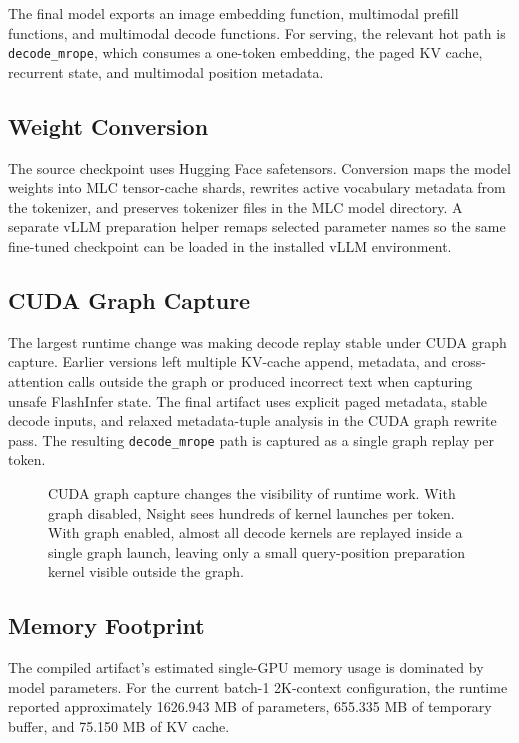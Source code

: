 \documentclass[10pt]{article}
\begin{document}
The final model exports an image embedding function, multimodal prefill
functions, and multimodal decode functions. For serving, the relevant hot path
is \texttt{decode\_mrope}, which consumes a one-token embedding, the paged KV
cache, recurrent state, and multimodal position metadata.

\subsection{Weight Conversion}

The source checkpoint uses Hugging Face safetensors. Conversion maps the model
weights into MLC tensor-cache shards, rewrites active vocabulary metadata from
the tokenizer, and preserves tokenizer files in the MLC model directory. A
separate vLLM preparation helper remaps selected parameter names so the same
fine-tuned checkpoint can be loaded in the installed vLLM environment.

\subsection{CUDA Graph Capture}

The largest runtime change was making decode replay stable under CUDA graph
capture. Earlier versions left multiple KV-cache append, metadata, and
cross-attention calls outside the graph or produced incorrect text when
capturing unsafe FlashInfer state. The final artifact uses explicit paged
metadata, stable decode inputs, and relaxed metadata-tuple analysis in the CUDA
graph rewrite pass. The resulting \texttt{decode\_mrope} path is captured as a
single graph replay per token.

\begin{figure}[t]
  \centering
  
  \caption{CUDA graph capture changes the visibility of runtime work. With graph
  disabled, Nsight sees hundreds of kernel launches per token. With graph
  enabled, almost all decode kernels are replayed inside a single graph launch,
  leaving only a small query-position preparation kernel visible outside the
  graph.}
  \label{fig:runtime-visibility}
\end{figure}

\subsection{Memory Footprint}

The compiled artifact's estimated single-GPU memory usage is dominated by model
parameters. For the current batch-1 2K-context configuration, the runtime
reported approximately 1626.943 MB of parameters, 655.335 MB of temporary
buffer, and 75.150 MB of KV cache.
\end{document}
